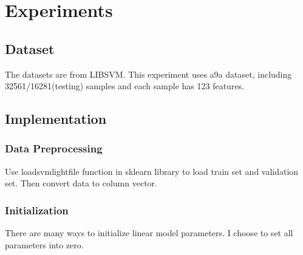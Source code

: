 \documentclass[journal, a4paper]{IEEEtran}
\begin{document}






\section{Experiments}
\subsection{Dataset}
The datasets are from LIBSVM. This experiment uses a9a dataset, including 32561/16281(testing) samples and each sample has 123 features.

\subsection{Implementation}

\subsubsection{Data Preprocessing}
Use load\textunderscore svmlight\textunderscore file function in sklearn library to load train set and validation set.
Then convert data to column vector.

\subsubsection{Initialization}
There are many ways to initialize linear model parameters.
I choose to set all parameters into zero.
\end{document}
